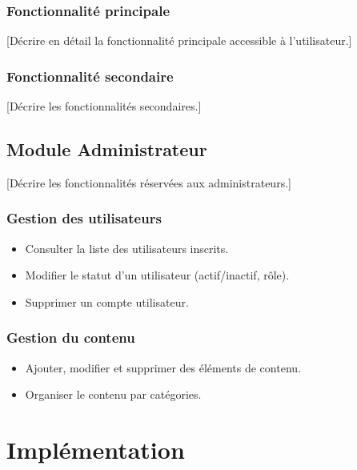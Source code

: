 \documentclass[12pt, a4paper]{article}
\begin{document}
\subsubsection{Fonctionnalité principale}

[Décrire en détail la fonctionnalité principale accessible à l'utilisateur.]

\subsubsection{Fonctionnalité secondaire}

[Décrire les fonctionnalités secondaires.]

\subsection{Module Administrateur}

[Décrire les fonctionnalités réservées aux administrateurs.]

\subsubsection{Gestion des utilisateurs}

\begin{itemize}
  \item Consulter la liste des utilisateurs inscrits.
  \item Modifier le statut d'un utilisateur (actif/inactif, rôle).
  \item Supprimer un compte utilisateur.
\end{itemize}

\subsubsection{Gestion du contenu}

\begin{itemize}
  \item Ajouter, modifier et supprimer des éléments de contenu.
  \item Organiser le contenu par catégories.
\end{itemize}

\section{Implémentation}
\end{document}
